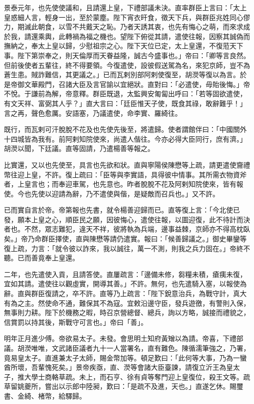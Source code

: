 \begin{pinyinscope}
景泰元年，也先使使議和，且請還上皇，下禮部議未決。直率群臣上言曰：「太上皇惑細人言，輕身一出，至於蒙塵。陛下宵衣旰食，徵天下兵，與群臣兆姓同心僇力，期滅此朝食，以雪不共戴天之恥。乃者天誘其衷，也先有悔心之萌，而來求成於我，請還乘輿，此轉禍為福之機也。望陛下俯從其請，遣使往報，因察其誠偽而撫納之，奉太上皇以歸，少慰祖宗之心。陛下天位已定，太上皇還，不復蒞天下事。陛下第崇奉之，則天倫厚而天眷益隆，誠古今盛事也。」帝曰：「卿等言良然。但前後使者五輩往，終不得要領。今復遣使，設彼假送駕為名，來犯京師，豈不為蒼生患。賊詐難信，其更議之。」已而瓦剌別部阿剌使復至，胡濙等復以為言。於是帝御文華殿門，召諸大臣及言官諭以宜絕狀。直對曰：「必遣使，毋貽後悔。」帝不悅。于謙前為解，帝意釋。群臣既退，太監興安匍匐出呼曰：「若等固欲遣使，有文天祥、富弼其人乎？」直大言曰：「廷臣惟天子使，既食其祿，敢辭難乎！」言之再，聲色愈厲。安語塞，乃議遣使，命李實、羅綺往。

既行，而瓦剌可汗脫脫不花及也先使先後至，將遣歸。使者謂館伴曰：「中國關外十四城皆為我有。前阿剌知院使來，尚遣人偕往。今亦必得大臣同行，庶有濟。」胡濙以聞，下廷議。直等固請，乃遣楊善等報之。

比實還，又以也先使至，具言也先欲和狀。直與寧陽侯陳懋等上疏，請更遣使齎禮幣往迎上皇，不許。復上疏曰：「臣等與李實語，具得彼中情事。其所需衣物資斧者，上皇言也；而奉迎車駕，也先意也。昨者脫脫不花及阿剌知院使來，皆有報使。今也先使以迎請為辭，乃不遣使與偕，是疑敵而召兵也。」又不許。

已而實自言於帝。帝第報也先書，就令楊善迎歸而已。直等復上言：「今北使已發，願本上皇之心，順臣民之願，因彼悔心，遣使往報，以圖迎復，此不待計而決者也。不然，眾志難犯，違天不祥，彼將執為兵端，邊事益棘，京師亦不得高枕臥矣。」帝乃命群臣擇使，直與陳懋等請仍遣實。報曰：「候善歸議之。」御史畢鑾等復上疏，力言：「就令彼以詐來，我以誠往，萬一不測，則我之兵力固在。」帝終不聽。已而善竟奉上皇還。

二年，也先遣使入貢，且請答使。直屢疏言：「邊備未修，芻糧未積，瘡痍未復，宜如其請。遣使往以觀虛實，開導其善。」不許。無何，也先遣騎入塞，以報使為辭。直與群臣復請之，卒不許。直等乃上疏言：「陛下銳意治兵，為戰守計，真大有為之主。然使命不通，難保其不為寇。宜敕沿邊守臣，發兵遊徼，有警則入保，無事則力耕。陛下於機務之暇，時召京營總督、總兵，詢以方略，誠接而禮貌之，信賞罰以持其後，斯戰守可言也。」帝曰「善」。

明年正月進少傅。帝欲易太子。未發。會思明土知府黃矰以為請。帝喜，下禮部議。胡濙唯唯，文武諸臣議者九十一人當署名，直有難色。陳循濡筆強之，乃署，竟易皇太子。直進兼太子太師，賜金幣加等。頓足歎曰：「此何等大事，乃為一蠻酋所壞，吾輩愧死矣。」景帝疾亟，直、濙等會諸大臣臺諫，請復立沂王為皇太子，推大學士商輅草疏。未上，而石亨、徐有貞等奪門迎上皇復位，殺王文等。疏草留姚夔所，嘗出以示郎中陸昶，歎曰：「是疏不及進，天也。」直遂乞休。賜璽書、金綺、楮幣，給驛歸。


\end{pinyinscope}

